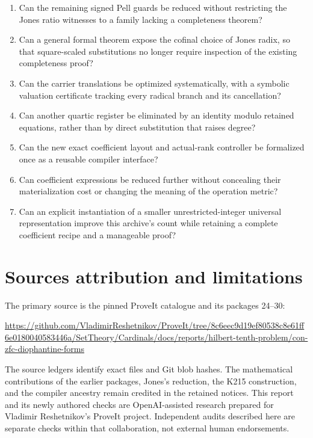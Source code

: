 \documentclass[
  10pt,
]{article}
\providecommand{\tightlist}{%
  \setlength{\itemsep}{0pt}\setlength{\parskip}{0pt}}
\begin{document}
\begin{enumerate}
\def\labelenumi{\arabic{enumi}.}
\tightlist
\item
  Can the remaining signed Pell guards be reduced without restricting
  the Jones ratio witnesses to a family lacking a completeness theorem?
\item
  Can a general formal theorem expose the cofinal choice of Jones radix,
  so that square-scaled substitutions no longer require inspection of
  the existing completeness proof?
\item
  Can the carrier translations be optimized systematically, with a
  symbolic valuation certificate tracking every radical branch and its
  cancellation?
\item
  Can another quartic register be eliminated by an identity modulo
  retained equations, rather than by direct substitution that raises
  degree?
\item
  Can the new exact coefficient layout and actual-rank controller be
  formalized once as a reusable compiler interface?
\item
  Can coefficient expressions be reduced further without concealing
  their materialization cost or changing the meaning of the operation
  metric?
\item
  Can an explicit instantiation of a smaller unrestricted-integer
  universal representation improve this archive's count while retaining
  a complete coefficient recipe and a manageable proof?
\end{enumerate}

\section{Sources attribution and
limitations}\label{sources-attribution-and-limitations}

The primary source is the pinned ProveIt catalogue and its packages
24--30:

\url{https://github.com/VladimirReshetnikov/ProveIt/tree/8c6eec9d19ef80538c8e61ff6e0180040583446a/SetTheory/Cardinals/docs/reports/hilbert-tenth-problem/con-zfc-diophantine-forms}

The source ledgers identify exact files and Git blob hashes. The
mathematical contributions of the earlier packages, Jones's reduction,
the K215 construction, and the compiler ancestry remain credited in the
retained notices. This report and its newly authored checks are
OpenAI-assisted research prepared for Vladimir Reshetnikov's ProveIt
project. Independent audits described here are separate checks within
that collaboration, not external human endorsements.
\end{document}
